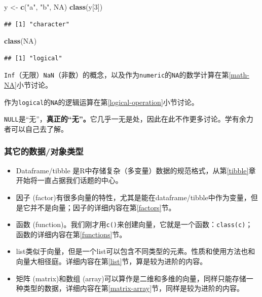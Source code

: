 \documentclass[]{book}
\newenvironment{Shaded}{\begin{snugshade}}{\end{snugshade}}
\newcommand{\DecValTok}[1]{\textcolor[rgb]{0.00,0.00,0.81}{#1}}
\newcommand{\KeywordTok}[1]{\textcolor[rgb]{0.13,0.29,0.53}{\textbf{#1}}}
\newcommand{\NormalTok}[1]{#1}
\newcommand{\OtherTok}[1]{\textcolor[rgb]{0.56,0.35,0.01}{#1}}
\newcommand{\StringTok}[1]{\textcolor[rgb]{0.31,0.60,0.02}{#1}}
\providecommand{\tightlist}{%
  \setlength{\itemsep}{0pt}\setlength{\parskip}{0pt}}
\begin{document}
\begin{Shaded}
\begin{Highlighting}[]
\NormalTok{y <-}\StringTok{ }\KeywordTok{c}\NormalTok{(}\StringTok{"a"}\NormalTok{, }\StringTok{"b"}\NormalTok{, }\OtherTok{NA}\NormalTok{)}
\KeywordTok{class}\NormalTok{(y[}\DecValTok{3}\NormalTok{])}
\end{Highlighting}
\end{Shaded}

\begin{verbatim}
## [1] "character"
\end{verbatim}

\begin{Shaded}
\begin{Highlighting}[]
\KeywordTok{class}\NormalTok{(}\OtherTok{NA}\NormalTok{)}
\end{Highlighting}
\end{Shaded}

\begin{verbatim}
## [1] "logical"
\end{verbatim}

\texttt{Inf}（无限）\texttt{NaN}（非数）的概念，以及作为\texttt{numeric}的\texttt{NA}的数学计算在第\ref{math-NA}小节讨论。

作为\texttt{logical}的\texttt{NA}的逻辑运算在第\ref{logical-operation}小节讨论。

\texttt{NULL}是``无''，\textbf{真正的``无''。}它几乎一无是处，因此在此不作更多讨论。学有余力者可以自己去了解。

\hypertarget{other-data-types}{%
\subsubsection{其它的数据/对象类型}\label{other-data-types}}

\begin{itemize}
\tightlist
\item
  Dataframe/tibble 是R中存储复杂（多变量）数据的规范格式，从第\ref{tibble}章开始将一直占据我们话题的中心。
\item
  因子 (factor)有很多向量的特性，尤其是能在dataframe/tibble中作为变量，但是它并不是向量；因子的详细内容在第\ref{factors}节。
\item
  函数 (function)。我们刚才用\texttt{c()}来创建向量，它就是一个函数：\texttt{class(c)}；函数的详细内容在第\ref{functions}节。
\item
  list类似于向量，但是一个list可以包含不同类型的元素。性质和使用方法也和向量大相径庭。详细内容在第\ref{list}节，算是较为进阶的内容。
\item
  矩阵 (matrix)和数组 (array)可以算作是二维和多维的向量，同样只能存储一种类型的数据，详细内容在第\ref{matrix-array}节，同样是较为进阶的内容。
\end{itemize}
\end{document}
